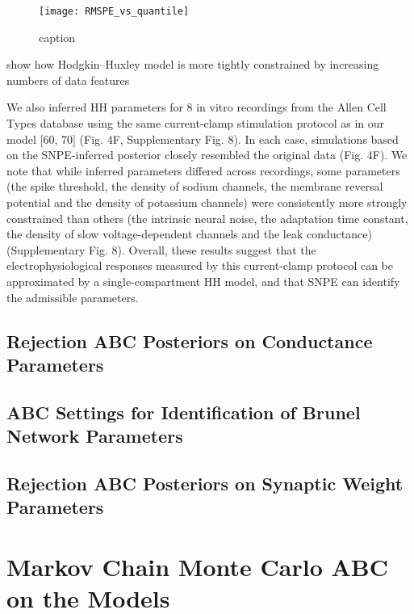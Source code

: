 \begin{figure}[H]
    \centering
    \texttt{[image: RMSPE\_vs\_quantile]}
    \caption{caption}
    \label{fig:fig1}
\end{figure} 


show how Hodgkin–Huxley model is more tightly constrained by increasing numbers of data features

We also inferred HH parameters for 8 in vitro recordings from the Allen Cell Types database using the same current-clamp stimulation protocol as in our model [60, 70] (Fig. 4F, Supplementary Fig. 8). In each case, simulations based on the SNPE-inferred posterior closely resembled the original data (Fig. 4F). We note that while inferred parameters differed across recordings, some parameters (the spike threshold, the density of sodium channels, the membrane reversal potential and the density of potassium channels) were consistently more strongly constrained than others (the intrinsic neural noise, the adaptation time constant, the density of slow voltage-dependent channels and the leak conductance) (Supplementary Fig. 8). Overall, these results suggest that the electrophysiological responses measured by this current-clamp protocol can be approximated by a single-compartment HH model, and that SNPE can identify the admissible parameters.

\section{Rejection ABC Posteriors on Conductance Parameters}

\section{ABC Settings for Identification of Brunel Network Parameters}

\section{Rejection ABC Posteriors on Synaptic Weight Parameters}

\chapter{Markov Chain Monte Carlo ABC on the Models}
